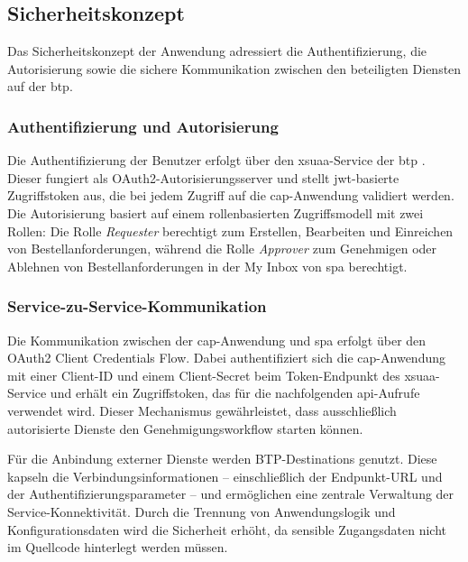 \subsection{Sicherheitskonzept}
\label{subsec:sicherheitskonzept}

Das Sicherheitskonzept der Anwendung adressiert die Authentifizierung, die Autorisierung sowie die sichere Kommunikation zwischen den beteiligten Diensten auf der \gls{btp}.

\subsubsection{Authentifizierung und Autorisierung}

Die Authentifizierung der Benutzer erfolgt über den \gls{xsuaa}-Service der \gls{btp} \citep{sap2024xsuaa}. Dieser fungiert als OAuth2-Autorisierungsserver und stellt \gls{jwt}-basierte Zugriffstoken aus, die bei jedem Zugriff auf die \gls{cap}-Anwendung validiert werden. Die Autorisierung basiert auf einem rollenbasierten Zugriffsmodell mit zwei Rollen: Die Rolle \textit{Requester} berechtigt zum Erstellen, Bearbeiten und Einreichen von Bestellanforderungen, während die Rolle \textit{Approver} zum Genehmigen oder Ablehnen von Bestellanforderungen in der My Inbox von \gls{spa} berechtigt.

\subsubsection{Service-zu-Service-Kommunikation}

Die Kommunikation zwischen der \gls{cap}-Anwendung und \gls{spa} erfolgt über den OAuth2 Client Credentials Flow. Dabei authentifiziert sich die \gls{cap}-Anwendung mit einer Client-ID und einem Client-Secret beim Token-Endpunkt des \gls{xsuaa}-Service und erhält ein Zugriffstoken, das für die nachfolgenden \gls{api}-Aufrufe verwendet wird. Dieser Mechanismus gewährleistet, dass ausschließlich autorisierte Dienste den Genehmigungsworkflow starten können.

Für die Anbindung externer Dienste werden BTP-Destinations genutzt. Diese kapseln die Verbindungsinformationen -- einschließlich der Endpunkt-URL und der Authentifizierungsparameter -- und ermöglichen eine zentrale Verwaltung der Service-Konnektivität. Durch die Trennung von Anwendungslogik und Konfigurationsdaten wird die Sicherheit erhöht, da sensible Zugangsdaten nicht im Quellcode hinterlegt werden müssen.
